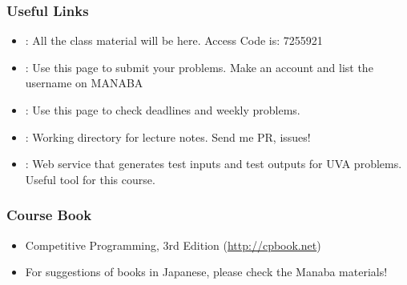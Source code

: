 \documentclass{beamer}
\begin{document}
\begin{frame}
  \frametitle{Useful Links}
  \begin{itemize}
  \item
    \href{https://manaba.tsukuba.ac.jp/ct/course_1149028}
         {}: All the class material
         will be here. Access Code is: 7255921

    \medskip

  \item \href{https://uva.onlinejudge.org/}{}:
    Use this page to submit your problems. \alert{Make an account and list the username on MANABA}

    \medskip

  \item \href{https://conclave.cs.tsukuba.ac.jp/lecture/monitor.html}{}:
    Use this page to check deadlines and weekly problems.

    \medskip

  \item
    \href{https://www.github.com/caranha/ProgrammingChallengesLectureNotes}{}:
    Working directory for lecture notes. Send me PR, issues!

    \medskip

  \item
    \href{https://www.udebug.com/}{}:
    Web service that generates test inputs and test outputs for UVA
    problems. Useful tool for this course.
  \end{itemize}
\end{frame}


\begin{frame}
  \frametitle{Course Book}

  \begin{itemize}
  \item Competitive Programming, 3rd Edition
    (\href{http://cpbook.net/}{http://cpbook.net})

    \bigskip

  \item For suggestions of books in Japanese, please check the Manaba materials!
  \end{itemize}
\end{frame}
\end{document}
